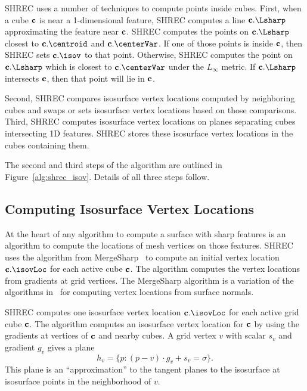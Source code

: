 SHREC uses a number of techniques to compute points inside cubes.
First, when a cube $\mathbf{c}$ is near a 1-dimensional feature,
SHREC computes a line $\cb.\Lsharp$ approximating the feature near $\mathbf{c}$.
SHREC computes the points on $\cb.\Lsharp$ closest to $\cb.\centroid$
and $\cb.\centerVar$.
If one of those points is inside $\mathbf{c}$,
then SHREC sets $\cb.\isov$ to that point.
Otherwise, SHREC computes the point on $\cb.\Lsharp$ 
which is closest to $\cb.\centerVar$ under the $L_\infty$ metric.
If $\cb.\Lsharp$ intersects $\mathbf{c}$, then that point will lie in $\mathbf{c}$.

Second, SHREC compares isosurface vertex locations 
computed by neighboring cubes and swaps or sets isosurface vertex locations
based on those comparisons.
Third, SHREC computes isosurface vertex locations on planes
separating cubes intersecting 1D features.
SHREC stores these isosurface vertex locations in the cubes containing them.

The second and third steps of the algorithm are outlined 
in Figure~\ref{alg:shrec_isov}.
Details of all three steps follow.


\subsection{Computing Isosurface Vertex Locations}
\label{section:loc}

At the heart of any algorithm to compute a surface with sharp features 
is an algorithm to compute the locations of mesh vertices on those features.
SHREC uses the algorithm from MergeSharp~\cite{bw-cisec-13}
to compute an initial vertex location $\cb.\isovLoc$ 
for each active cube $\mathbf{c}$.
The algorithm computes the vertex locations 
from gradients at grid vertices.
The MergeSharp algorithm is a variation 
of the algorithms in~\cite{jlsw-dchd-02,kbsh-fssev-01,sw-dcss-02,zhk-dctps-04}
for computing vertex locations from surface normals.

SHREC computes one isosurface vertex location $\cb.\isovLoc$
for each active grid cube $\mathbf{c}$.
The algorithm computes an isosurface vertex location for $\mathbf{c}$
by using the gradients at vertices of $\mathbf{c}$ and nearby cubes.
A grid vertex $v$ with scalar $s_{v}$ and gradient $g_{v}$ gives a plane
\begin{equation}
\label{eqn:isoplane}
h_v = \{p : (p-v) \cdot g_{v} + s_{v}= \sigma \}.
\end{equation}
This plane is an ``approximation'' to the tangent planes to the isosurface
at isosurface points in the neighborhood of $v$.

